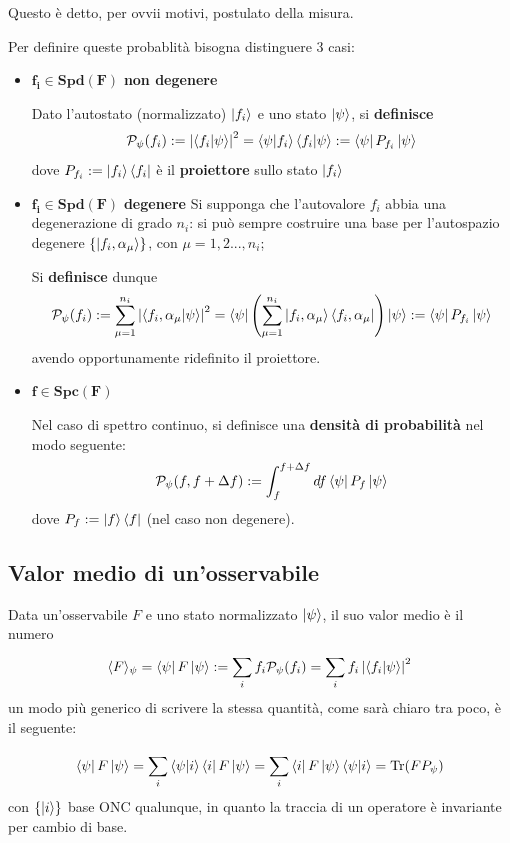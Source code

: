 Questo è detto, per ovvii motivi, postulato della misura.

Per definire queste probablità bisogna distinguere 3 casi:

\begin{itemize}
    \item $\mathbf{f_i \in Spd(F)}$ \textbf{non degenere}
    
	Dato l'autostato (normalizzato) $\ket{f_i}$ e uno stato $\ket{\psi}$, si \textbf{definisce}	
	$$\mathcal{P}_{\psi}(f_i):= \left| \bra{f_i}\ket{\psi} \right|^2 =
	\bra{\psi}\ket{f_i}\bra{f_i}\ket{\psi} := \bra{\psi}P_{f_i}\ket{\psi}$$
	dove $P_{f_i} := \ket{f_i}\bra{f_i}$ è il \textbf{proiettore} sullo stato $\ket{f_i}$

    \item $\mathbf{f_i \in Spd(F)}$ \textbf{degenere}
	Si supponga che l'autovalore $f_i$ abbia una degenerazione di grado $n_i$:
	si può sempre costruire una base per l'autospazio degenere $\left\{\ket{f_i,\alpha_\mu}\right\}$,
	con $\mu = 1,2...,n_i$;

	Si \textbf{definisce} dunque
	$$\mathcal{P}_\psi(f_i):=\sum_{\mu=1}^{n_i}\left|\bra{f_i,\alpha_\mu}\ket{\psi}\right|^2
	= \bra{\psi}\left(\sum_{\mu=1}^{n_i}\ket{f_i,\alpha_\mu}\bra{f_i,\alpha_\mu} \right)\ket{\psi}:=
	\bra{\psi}P_{f_i}\ket{\psi}$$
	avendo opportunamente ridefinito il proiettore.
    \item $\mathbf{f\in Spc(F)}$

	Nel caso di spettro continuo, si definisce una \textbf{densità di probabilità} nel modo seguente:
	$$\mathcal{P}_\psi(f,f+\Delta f) := \int_{f}^{f+\Delta f}df \bra{\psi}P_f\ket{\psi}$$
	dove $P_f:=\ket{f}\bra{f}$ (nel caso non degenere).	
\end{itemize}

\subsection{Valor medio di un'osservabile}
Data un'osservabile $F$ e uno stato normalizzato $\ket{\psi}$, il suo valor medio è il numero
$$\langle F \rangle_\psi = \bra{\psi}F\ket{\psi} := \sum_{i}^{}f_i\mathcal{P}_\psi(f_i) =
\sum_{i}^{}f_i\left| \bra{f_i}\ket{\psi} \right|^2$$
un modo più generico di scrivere la stessa quantità, come sarà chiaro tra poco, è il seguente:

$$
\bra{\psi}F\ket{\psi} = \sum_{i}^{}\bra{\psi}\ket{i}\bra{i}F\ket{\psi} =
\sum_{i}^{}\bra{i}F\ket{\psi}\bra{\psi}\ket{i} = \Tr(FP_{\psi})
$$
con $\left\{\ket{i}\right\}$ base ONC qualunque, in quanto la traccia di un operatore è invariante per
cambio di base.

